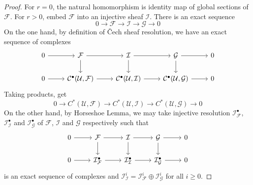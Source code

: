 \documentclass{ctexart}
\begin{document}
\begin{proof}
    For $r = 0$, the natural homomorphism is identity map of global sections of $\mathcal{F}$.
    For $r > 0$, embed $\mathcal{F}$ into an injective sheaf $\mathcal{I}$.
    There is an exact sequence
    \begin{equation}
        0 \longrightarrow \mathcal{F} \longrightarrow \mathcal{I} \longrightarrow \mathcal{G} \longrightarrow 0
    \end{equation}
    On the one hand, by definition of Čech sheaf resolution, we have an exact sequence of complexes
    \begin{equation}
        \begin{tikzcd}
            0 \arrow[r] &
            \mathcal{F} \arrow[r] \arrow[d] &
            \mathcal{I} \arrow[r] \arrow[d] &
            \mathcal{G} \arrow[r] \arrow[d] &
            0 \\
            0 \arrow[r] &
            \mathcal{C}^{\bullet}(\mathcal{U}, \mathcal{F}) \arrow[r] &
            \mathcal{C}^{\bullet}(\mathcal{U}, \mathcal{I}) \arrow[r] &
            \mathcal{C}^{\bullet}(\mathcal{U}, \mathcal{G}) \arrow[r] &
            0
        \end{tikzcd}
    \end{equation}
    Taking products, get
    \begin{equation}
        0 \longrightarrow C^{\ast}(\mathcal{U}, \mathcal{F}) \longrightarrow C^{\ast}(\mathcal{U}, \mathcal{I}) \longrightarrow C^{\ast}(\mathcal{U}, \mathcal{G}) \longrightarrow 0
    \end{equation}
    On the other hand, by Horseshoe Lemma, we may take injective resolution $\mathcal{I}_{\mathcal{F}}^{\bullet}$, $\mathcal{I}_{\mathcal{I}}^{\bullet}$ and $\mathcal{I}_{\mathcal{G}}^{\bullet}$ of $\mathcal{F}$, $\mathcal{I}$ and $\mathcal{G}$ respectively such that
    \begin{equation}
        \begin{tikzcd}
            0 \arrow[r] &
            \mathcal{F} \arrow[r] \arrow[d] &
            \mathcal{I} \arrow[r] \arrow[d] &
            \mathcal{G} \arrow[r] \arrow[d] &
            0 \\
            0 \arrow[r] &
            \mathcal{I}_{\mathcal{F}}^{\bullet} \arrow[r] &
            \mathcal{I}_{\mathcal{I}}^{\bullet} \arrow[r] &
            \mathcal{I}_{\mathcal{G}}^{\bullet} \arrow[r] &
            0
        \end{tikzcd}
    \end{equation}
    is an exact sequence of complexes and $\mathcal{I}_{\mathcal{I}}^{i} = \mathcal{I}_{\mathcal{F}}^{i} \oplus \mathcal{I}_{\mathcal{G}}^{i}$ for all $i \ge 0$.

\end{proof}
\end{document}

